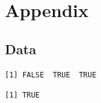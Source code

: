 \documentclass[
  letterpaper,
  DIV=11,
  numbers=noendperiod]{scrartcl}
\begin{document}
\renewcommand{\bibsection}{}


\setcounter{section}{0}
\renewcommand{\thesection}{\Alph{section}}

\setcounter{table}{0}
\renewcommand{\thetable}{A\arabic{table}}

\setcounter{figure}{0}
\renewcommand{\thefigure}{A\arabic{figure}}

\newpage

\section{Appendix}\label{appendix}

\subsection{Data}\label{data}

\begin{verbatim}
[1] FALSE  TRUE  TRUE
\end{verbatim}

\begin{verbatim}
[1] TRUE
\end{verbatim}
\end{document}
